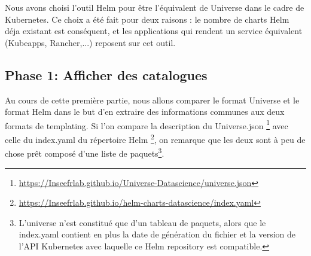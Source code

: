 \documentclass[11pt,fleqn]{book} %
\begin{document}
Nous avons choisi l'outil Helm pour être l'équivalent de Universe dans le cadre de Kubernetes. Ce choix a été fait pour deux raisons : le nombre de charts Helm déja existant est conséquent, et les applications qui rendent un service équivalent (Kubeapps, Rancher,...) reposent sur cet outil. 
\subsection{Phase 1: Afficher des catalogues}
Au cours de cette première partie, nous allons comparer le format Universe et le format Helm dans le but d'en extraire des informations communes aux deux formats de templating. Si l'on compare la description du Universe.json \footnote{\url{https://Inseefrlab.github.io/Universe-Datascience/universe.json}} avec celle du index.yaml du répertoire Helm \footnote{\url{https://Inseefrlab.github.io/helm-charts-datascience/index.yaml}}, on remarque que les deux sont à peu de chose prêt composé d'une liste de paquets\footnote{L'universe n'est constitué que d'un tableau de paquets, alors que le index.yaml contient en plus la date de génération du fichier et la version de l'API Kubernetes avec laquelle ce Helm repository est compatible.}. \\ 
\end{document}
